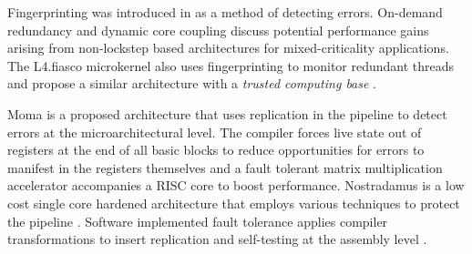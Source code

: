 Fingerprinting was introduced in \cite{Smolens:04} as a method of detecting errors. On-demand redundancy \cite{Meyer:CASES11,fu2013demand} and dynamic core coupling \cite{lafrieda2007utilizing} discuss potential performance gains arising from non-lockstep based architectures for mixed-criticality applications.  The L4.fiasco microkernel also uses fingerprinting to monitor redundant threads \cite{dobel2012operating} and propose a similar architecture with a \emph{trusted computing base} \cite{dobel2012watches}.

Moma \cite{ferreira2014adaptive} is a proposed architecture that uses replication in the pipeline to detect errors at the microarchitectural level. The compiler forces live state out of registers at the end of all basic blocks to reduce opportunities for errors to manifest in the registers themselves and a fault tolerant matrix multiplication accelerator accompanies a RISC core to boost performance. Nostradamus is a low cost single core hardened architecture that employs various techniques to protect the pipeline \cite{nathan2014nostradamus}. Software implemented fault tolerance applies compiler transformations to insert replication and self-testing at the assembly level \cite{reis2005swift}.